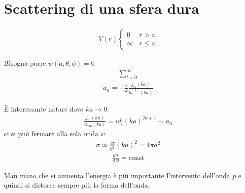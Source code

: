 
\section{Scattering di una sfera dura} %
\begin{equation}\begin{split}
V\left(r\right)
\begin{cases}
0 & r>a\\
\infty  & r\le a
\end{cases}
\end{split}\end{equation}

Bisogna porre $\psi \left(a,\theta,\phi\right)=0$
\begin{equation}\begin{split}
\sum_{l=0}^{\infty }%
\end{split}\end{equation}
\begin{equation}\begin{split}
a_n=-\frac{i}{k}\frac{j_m\left(ka\right)}{h^{\left(1\right)}_n\left(ka\right)}
\end{split}\end{equation}

È interrssante notare dove $ka\to 0$:
\begin{equation}\begin{split}
\frac{j_m\left(ka\right)}{in_m\left(ka\right)}=id_l\left(ka\right)^{2n+1}\sim a_n
\end{split}\end{equation}
ci si può fermare alla sola onda $s$:
\begin{equation}\begin{split}
\sigma\simeq \frac{4\pi}{k^2}\left(ka\right)^2=4\pi a^2
\end{split}\end{equation}
\begin{equation}\begin{split}
\frac{d\sigma}{d\Omega}=\textrm{const}
\end{split}\end{equation}

Man mano che si aumenta l'energia è più importante l'intervento dell'onda $p$ e quindi si distorce sempre più la forma dell'onda.